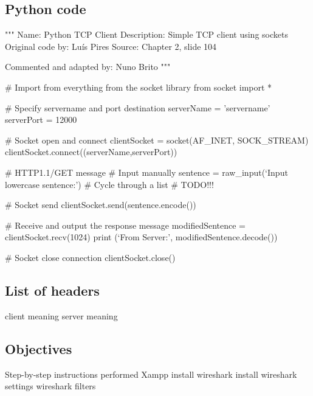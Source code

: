 \documentclass[11pt]{report}
\begin{document}
\subsection{Python code}
    """
    Name: Python TCP Client
    Description: Simple TCP client using sockets
    Original code by: Luís Pires
    Source: Chapter 2, slide 104
    
    Commented and adapted by: Nuno Brito
    """
    
    # Import from everything from the socket library
    from socket import *
    
    # Specify servername and port destination
    serverName = ’servername’
    serverPort = 12000
    
    # Socket open and connect
    clientSocket = socket(AF_INET, SOCK_STREAM)
    clientSocket.connect((serverName,serverPort))
    
    # HTTP1.1/GET message
    #   Input manually
    sentence = raw_input(‘Input lowercase sentence:’)
    #   Cycle through a list
    # TODO!!!
    
    # Socket send
    clientSocket.send(sentence.encode())
    
    # Receive and output the response message
    modifiedSentence = clientSocket.recv(1024)
    print (‘From Server:’, modifiedSentence.decode())
    
    # Socket close connection
    clientSocket.close()

\subsection{List of headers}
    client
        meaning
    server
        meaning

\subsection{Objectives}

Step-by-step instructions performed
Xampp install
wireshark install
wireshark settings
wireshark filters
\end{document}
